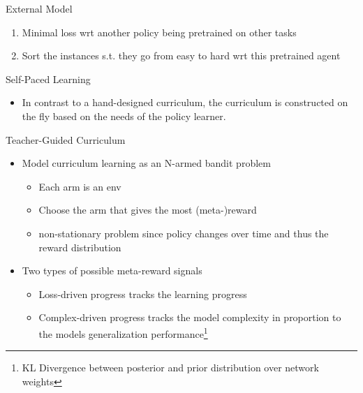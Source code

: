 \begin{frame}[c]{External Model}
	
	\begin{enumerate}
		\item Minimal loss wrt another policy being pretrained on other tasks
		\item Sort the instances s.t. they go from easy to hard wrt this pretrained agent~
	\end{enumerate}
	
\end{frame}
\begin{frame}[c]{Self-Paced Learning}
	
	\begin{itemize}
		\item In contrast to a hand-designed curriculum, the curriculum is constructed on the fly based on the needs of the policy learner.
	\end{itemize}
	
\end{frame}
\begin{frame}[c]{Teacher-Guided Curriculum }
	
	\begin{itemize}
		\item Model curriculum learning as an N-armed bandit problem
		\begin{itemize}
			\item Each arm is an env 
			\item Choose the arm that gives the most (meta-)reward
			\item non-stationary problem since policy changes over time and thus the reward distribution
		\end{itemize}
		\smallskip
		\item Two types of possible meta-reward signals
		\begin{itemize}
			\item Loss-driven progress tracks the learning progress
			\item Complex-driven progress tracks the model complexity in proportion to the models generalization performance\footnote{KL Divergence between posterior and prior distribution over network weights}
		\end{itemize}
	\end{itemize}
	
\end{frame}
